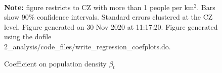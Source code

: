 \begin{figure}[!h]
\centering
\caption{Coefficient on population density $ \beta_t $}
\label{figure:baseline_gradients}
  \\ 
\par \begin{minipage}[h]{\textwidth}{\tiny\textbf{Note:} figure restricts to CZ with more than 1 people per km$^2$. Bars show 90\% confidence intervals. Standard errors clustered at the CZ level. Figure generated on 30 Nov 2020 at 11:17:20. Figure generated using the dofile 2\_analysis/code\_files/write\_regression\_coefplots.do.}\end{minipage}
\end{figure}

